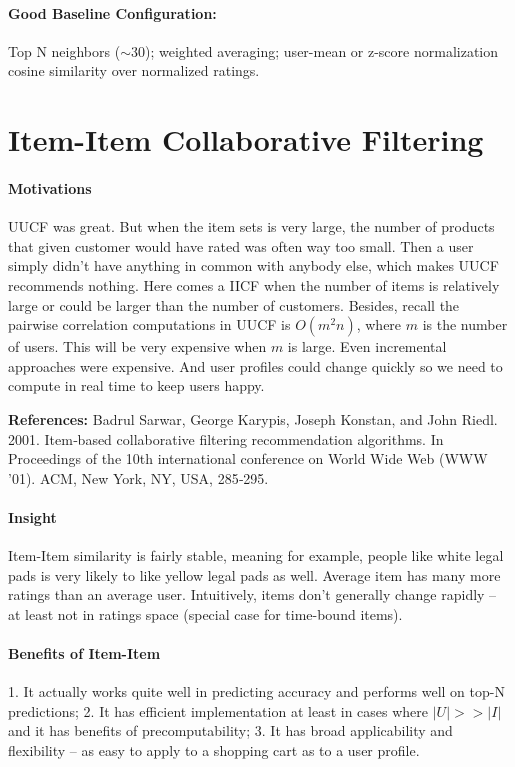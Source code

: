 \documentclass{article}
\theoremstyle{definition}
\begin{document}
\paragraph{Good Baseline Configuration:} Top N neighbors ($\sim$30); weighted averaging; user-mean or z-score normalization cosine similarity over normalized ratings.

\section{Item-Item Collaborative Filtering}
\paragraph{Motivations}
UUCF was great. But when the item sets is very large, the number of products that given customer would have rated was often way too small. Then a user simply didn't have anything in common with anybody else, which makes UUCF recommends nothing. Here comes a IICF when the number of items is relatively large or could be larger than the number of customers. Besides, recall the pairwise correlation computations in UUCF is $O(m^2 n)$, where $m$ is the number of users. This will be very expensive when $m$ is large. Even incremental approaches were expensive. And user profiles could change quickly so we need to compute in real time to keep users happy. 

\textbf{References:} Badrul Sarwar, George Karypis, Joseph Konstan, and John Riedl. 2001. Item‐based collaborative filtering recommendation algorithms. In Proceedings of the 10th international conference on World Wide Web (WWW '01). ACM, New York, NY, USA, 285‐295.

\paragraph{Insight} Item-Item similarity is fairly stable, meaning for example, people like white legal pads is very likely to like yellow legal pads as well. Average item has many more ratings than an average user. Intuitively, items don't generally change rapidly -- at least not in ratings space (special case for time-bound items).

\paragraph{Benefits of Item-Item} 1. It actually works quite well in predicting accuracy and performs well on top-N predictions; 2. It has efficient implementation at least in cases where $|U| >> |I|$ and it has benefits of precomputability; 3. It has broad applicability and flexibility -- as easy to apply to a shopping cart as to a user profile. 
\end{document}
